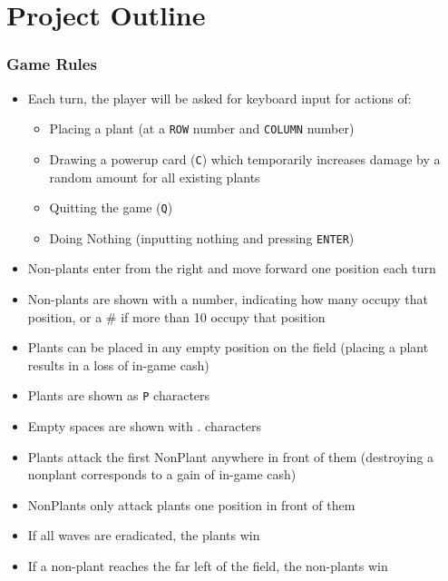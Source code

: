 \documentclass{42-en}
\begin{document}
\chapter{Project Outline}

	\subsection{Game Rules}

            \begin{itemize}\itemsep1pt
                \item Each turn, the player will be asked for keyboard input for actions of:
                \begin{itemize}
                    \item Placing a plant (at a \texttt{ROW} number and \texttt{COLUMN} number)
                    \item Drawing a powerup card (\texttt{C}) which temporarily increases damage by a random amount for all existing plants
                    \item Quitting the game (\texttt{Q})
                    \item Doing Nothing (inputting nothing and pressing \texttt{ENTER})
                \end{itemize}
                \item Non-plants enter from the right and move forward one position each turn
                \item Non-plants are shown with a number, indicating how many occupy that position, or a \# if more than 10 occupy that position
                \item Plants can be placed in any empty position on the field (placing a plant results in a loss of in-game cash)
                \item Plants are shown as \texttt{P} characters
                \item Empty spaces are shown with . characters
                \item Plants attack the first NonPlant anywhere in front of them (destroying a nonplant corresponds to a gain of in-game cash)
                \item NonPlants only attack plants one position in front of them
                \item If all waves are eradicated, the plants win
                \item If a non-plant reaches the far left of the field, the non-plants win
                \\
            \end{itemize}
        \newpage
\end{document}
